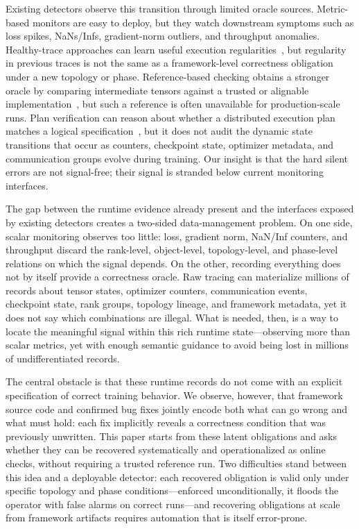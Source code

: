 \documentclass[sigconf,nonacm]{acmart}
\begin{document}
Existing detectors observe this transition through limited oracle sources. Metric-based monitors are easy to deploy, but they watch downstream symptoms such as loss spikes, NaNs/Infs, gradient-norm outliers, and throughput anomalies. Healthy-trace approaches can learn useful execution regularities~\cite{jiang2025traincheck}, but regularity in previous traces is not the same as a framework-level correctness obligation under a new topology or phase. Reference-based checking obtains a stronger oracle by comparing intermediate tensors against a trusted or alignable implementation~\cite{ttrace2025}, but such a reference is often unavailable for production-scale runs. Plan verification can reason about whether a distributed execution plan matches a logical specification~\cite{trainverify2025}, but it does not audit the dynamic state transitions that occur as counters, checkpoint state, optimizer metadata, and communication groups evolve during training. Our insight is that the hard silent errors are not signal-free; their signal is stranded below current monitoring interfaces.

The gap between the runtime evidence already present and the interfaces exposed by existing detectors creates a two-sided data-management problem. On one side, scalar monitoring observes too little: loss, gradient norm, NaN/Inf counters, and throughput discard the rank-level, object-level, topology-level, and phase-level relations on which the signal depends. On the other, recording everything does not by itself provide a correctness oracle. Raw tracing can materialize millions of records about tensor states, optimizer counters, communication events, checkpoint state, rank groups, topology lineage, and framework metadata, yet it does not say which combinations are illegal.
What is needed, then, is a way to locate the meaningful signal within this rich runtime state---observing more than scalar metrics, yet with enough semantic guidance to avoid being lost in millions of undifferentiated records.

The central obstacle is that these runtime records do not come with an explicit specification of correct training behavior. We observe, however, that framework source code and confirmed bug fixes jointly encode both what can go wrong and what must hold: each fix implicitly reveals a correctness condition that was previously unwritten. This paper starts from these latent obligations and asks whether they can be recovered systematically and operationalized as online checks, without requiring a trusted reference run.
Two difficulties stand between this idea and a deployable detector: each recovered obligation is valid only under specific topology and phase conditions---enforced unconditionally, it floods the operator with false alarms on correct runs---and recovering obligations at scale from framework artifacts requires automation that is itself error-prone.
\end{document}
